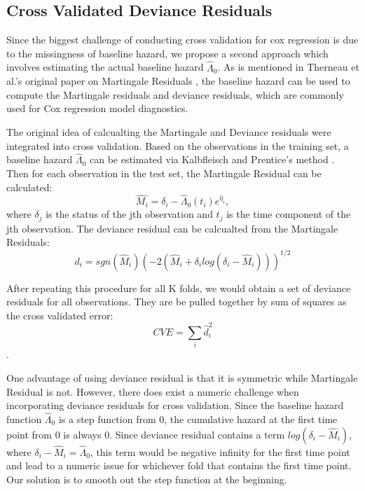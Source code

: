 \documentclass{article}\usepackage[]{graphicx}\usepackage[]{color}
\begin{document}
  \subsection{Cross Validated Deviance Residuals}
  
Since the biggest challenge of conducting cross validation for cox regression is due to the missingness of baseline hazard, we propose a second approach which involves estimating the actual baseline hazard $\hat{\Lambda}_{0}$. As is mentioned in Therneau et al.'s original paper on Martingale Residuals \citep{Therneau1990}, the baseline hazard can be used to compute the Martingale residuals and deviance residuals, which are commonly used for Cox regression model diagnostics. 

\par The original idea of calcualting the Martingale and Deviance residuals were integrated into cross validation. Based on the observations in the training set, a baseline hazard $\hat{\Lambda}_{0}$ can be estimated via Kalbfleisch and Prentice's method \citep{Kalbfleisch2011}. Then for each observation in the test set, the Martingale Residual can be calculated: \begin{equation}\hat{M_{i}} = \delta_{i} -\hat{\Lambda}_{0}(t_{i})e^{\hat{\eta}_{i}},\end{equation} where $\delta_{j}$ is the status of the jth observation and $t_{j}$ is the time component of the jth observation. The deviance residual can be calcualted from the Martingale Residuals: \begin{equation} d_{i} = sgn(\hat{M}_{i})(-2(\hat{M}_{i} + \delta_{i}log(\delta_{i} - \hat{M}_{i})))^{1/2}\end{equation}


After repeating this procedure for all K folds, we would obtain a set of deviance residuals for all observations. They are be pulled together by sum of squares as the cross validated error:
\begin{equation}CVE = \sum_{i}\hat{d}_{i}^2\end{equation}.

One advantage of using deviance residual is that it is symmetric while Martingale Residual is not. However, there does exist a numeric challenge when incorporating deviance residuals for cross validation. Since the baseline hazard function $\hat{\Lambda}_{0}$ is a step function from 0, the cumulative hazard at the first time point from 0 is always 0. Since deviance residual contains a term $log(\delta_{i} - \hat{M}_{i})$, where $\delta_{i} - \hat{M}_{i} = \hat{\Lambda}_{0}$, this term would be negative infinity for the first time point and lead to a numeric issue for whichever fold that contains the first time point. Our solution is to smooth out the step function at the beginning.
\end{document}
